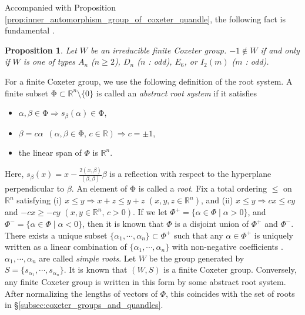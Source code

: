 \documentclass{amsart}
\newtheorem{proposition}[theorem]{Proposition}
\theoremstyle{definition}
\theoremstyle{remark}
\numberwithin{equation}{section}
\begin{document}
Accompanied with Proposition \ref{prop:inner_automorphism_group_of_coxeter_quandle}, 
the following fact is fundamental \cite[Corollary 3.19]{Humphreys}.
\begin{proposition}
\label{prop:contains_-1}
Let $W$ be an irreducible finite Coxeter group.
$-1 \notin W$ if and only if $W$ is one of types $A_n$  ($n \geq 2$), 
$D_n$ ($n$ : odd), $E_6$, or $I_2(m)$ ($m$ : odd).
\end{proposition}


For a finite Coxeter group, we use the following definition of the root system.
A finite subset $\mathrm{\Phi} \subset \mathbb{R}^n \setminus \{ 0 \}$ is called 
an \emph{abstract root system} if it satisfies 
\begin{itemize}
\item
$\alpha, \beta \in \mathrm{\Phi} \Longrightarrow  
s_{\beta}(\alpha) \in \mathrm{\Phi}$,
\item
$\beta = c \alpha  \,\,\, (\alpha, \beta \in \mathrm{\Phi}, \, c \in \mathbb{R}) 
\Longrightarrow c = \pm 1$,
\item
the linear span of $\Phi$ is $\mathbb{R}^n$.
\end{itemize}
Here, $s_{\beta} (x) = x - \frac{2 (x, \beta)}{(\beta, \beta)} \beta$ 
is a reflection with respect to the hyperplane 
perpendicular to $\beta$.
An element of $\mathrm{\Phi}$ is called a \emph{root}.
Fix a total ordering $\leq$ on $\mathbb{R}^n$ satisfying 
(i) $x \leq y \Longrightarrow x + z \leq y + z$ $(x, y, z \in \mathbb{R}^n)$, and
(ii) $x \leq y \Longrightarrow c x \leq c y$ and $ -c x \geq -c y$
$(x, y \in \mathbb{R}^n, \, c > 0)$.
If we let $\Phi^{+} = \{ \alpha \in \Phi \mid \alpha > 0 \}$, 
and $\Phi^{-} = \{ \alpha \in \Phi \mid \alpha < 0 \}$, 
then it is known that $\Phi$ is a disjoint union of $\Phi^{+}$ and $\Phi^{-}$.
There exists a unique subset $\{ \alpha_1, \cdots , \alpha_n \} \subset \Phi^{+}$ 
such that any $\alpha \in \Phi^+$ is uniquely written as a linear combination of 
$\{ \alpha_1, \cdots , \alpha_n \}$ with non-negative coefficients 
\cite[Theorem 1.3]{Humphreys}.
$\alpha_1, \cdots , \alpha_n$ are called \emph{simple roots}.
Let $W$ be the group generated by $S = \{ s_{\alpha_1}, \cdots , s_{\alpha_n} \}$.
It is known that $(W, S)$ is a finite Coxeter group.
Conversely, any finite Coxeter group is written in this form by some abstract root system.
After normalizing the lengths of vectors of $\Phi$, 
this coincides with the set of roots in \S \ref{subsec:coxeter_groups_and_quandles}.
\end{document}
